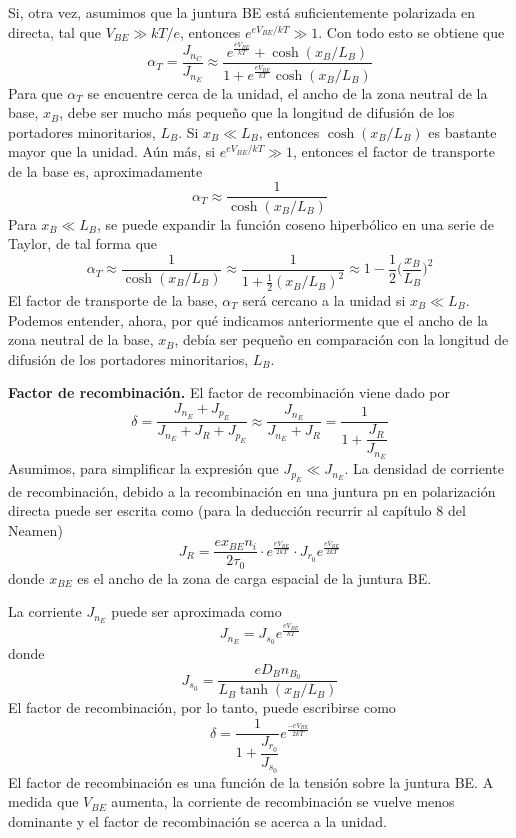 \documentclass[12pt,a4paper]{article}
\begin{document}
Si, otra vez, asumimos que la juntura BE está suficientemente polarizada en directa, tal que $V_{BE} \gg kT/e$, entonces $e^{eV_{BE}/kT} \gg 1$. Con todo esto se obtiene que
\[ \alpha _{T}=\frac{J_{n_{C}}}{J_{n_{E}}} \approx \frac{e^{\frac{eV_{BE}}{kT}}+\cosh (x_{B}/L_{B})}{1+e^{\frac{eV_{BE}}{kT}}\cosh(x_{B}/L_{B})} \]
Para que $\alpha _{T}$ se encuentre cerca de la unidad, el ancho de la zona neutral de la base, $x_{B}$, debe ser mucho más pequeño que la longitud de difusión de los portadores minoritarios, $L_{B}$. Si $x_{B} \ll L_{B}$, entonces $\cosh (x_{B}/L_{B})$ es bastante mayor que la unidad. Aún más, si $e^{eV_{BE}/kT} \gg 1$, entonces el factor de transporte de la base es, aproximadamente
\[ \alpha _{T}\approx \frac{1}{\cosh(x_{B}/L_{B})} \]
Para $x_{B} \ll L_{B}$, se puede expandir la función coseno hiperbólico en una serie de Taylor, de tal forma que
\[ \alpha _{T} \approx \frac{1}{\cosh(x_{B}/L_{B})} \approx \frac{1}{1+\frac{1}{2}(x_{B}/L_{B})^{2}}\approx 1-\frac{1}{2} \bigg( \frac{x_{B}}{L_{B}} \bigg)^{2} \]
El factor de transporte de la base, $\alpha _{T}$ será cercano a la unidad si $x_{B} \ll L_{B}$. Podemos entender, ahora, por qué indicamos anteriormente que el ancho de la zona neutral de la base, $x_{B}$, debía ser pequeño en comparación con la longitud de difusión de los portadores minoritarios, $L_{B}$.

\textbf{Factor de recombinación.} El factor de recombinación viene dado por
\[ \delta = \frac{J_{n_{E}}+J_{p_{E}}}{J_{n_{E}}+J_{R}+J_{p_{E}}} \approx \frac{J_{n_{E}}}{J_{n_{E}}+J_{R}} = \frac{1}{1+\dfrac{J_{R}}{J_{n_{E}}}} \]
Asumimos, para simplificar la expresión que $J_{p_{E}} \ll J_{n_{E}}$. La densidad de corriente de recombinación, debido a la recombinación en una juntura pn en polarización directa puede ser escrita como (para la deducción recurrir al capítulo 8 del Neamen)
\[ J_{R}=\frac{ex_{BE}n_{i}}{2 \tau _{0}} \cdot e^{\frac{eV_{BE}}{2kT}} \cdot J_{r_{0}}e^{\frac{eV_{BE}}{2kT}} \]
donde $x_{BE}$ es el ancho de la zona de carga espacial de la juntura BE.

La corriente $J_{n_{E}}$ puede ser aproximada como
\[ J_{n_{E}}=J_{s_{0}}e^{\frac{eV_{BE}}{kT}} \]
donde
\[ J_{s_{0}}=\frac{eD_{B}n_{B_{0}}}{L_{B} \tanh(x_{B}/L_{B})} \]
El factor de recombinación, por lo tanto, puede escribirse como
\[ \delta = \frac{1}{1+\dfrac{J_{r_{0}}}{J_{s_{0}}}}e^{\frac{-eV_{BE}}{2kT}} \]
El factor de recombinación es una función de la tensión sobre la juntura BE. A medida que $V_{BE}$ aumenta, la corriente de recombinación se vuelve menos dominante y el factor de recombinación se acerca a la unidad.
\end{document}
